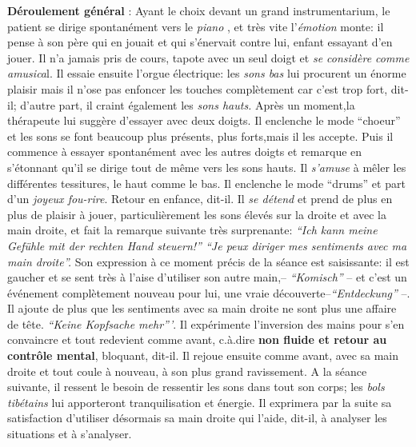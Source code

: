  	 \textbf{Déroulement général} : 
Ayant le choix devant un grand instrumentarium,
        le patient se dirige spontanément vers le \textit{piano },  et très vite
        l'\textit{émotion} monte: il pense à son père qui en jouait et qui
        s'énervait contre lui, enfant essayant d'en
        jouer. Il n'a jamais pris de cours, tapote avec un seul doigt et \textit{se considère comme
        amusica}l. Il essaie ensuite l'orgue électrique: les \textit{sons bas}
        lui procurent un énorme plaisir mais il n'ose pas enfoncer les touches
        complètement car c'est trop fort, dit-il; d'autre part, il
        craint également les
        \textit{sons hauts.}
        Après un moment,la thérapeute lui suggère d'essayer avec deux doigts.
        Il enclenche le mode ``choeur'' et les sons se font beaucoup
        plus présents, plus forts,mais il les accepte. Puis il commence à essayer spontanément
        avec les autres doigts et remarque en s'étonnant qu'il se
        dirige tout de même vers les sons
        hauts. Il \textit{s'amuse} à mêler les différentes tessitures,
        le haut comme le bas.
        Il enclenche le mode ``drums'' et part d'un\textit{ joyeux
        fou-rire}. Retour en enfance, dit-il.
        Il \textit{se détend} et prend de plus en plus de plaisir à jouer, particulièrement  les sons élevés
        sur la droite et avec la main droite, et fait
        la remarque suivante très surprenante:
        \textit{``Ich kann meine Gefühle mit der rechten Hand steuern!''
        ``Je peux diriger mes sentiments avec ma main droite''.}
 Son expression à ce moment précis de la séance est saisissante: il
        est gaucher et se sent très à l'aise d'utiliser son autre
        main,-- \textit{``Komisch''} -- et c'est un événement complètement nouveau pour lui, une vraie
        découverte--\textit{``Entdeckung''} --.
        Il ajoute de plus que les sentiments avec sa main
        droite ne sont plus une affaire de tête. \textit{``Keine
        Kopfsache mehr'''}. Il expérimente l'inversion des mains pour s'en convaincre et tout redevient comme
        avant, c.à.dire \textbf{non fluide et retour au contrôle
          mental}, 
        bloquant, dit-il. Il rejoue ensuite comme avant, avec sa main droite et tout
        coule à nouveau, à son plus grand ravissement.
        A la séance suivante, il ressent le besoin  de ressentir 
        les sons dans tout son corps; les\textit{ bols tibétains } lui
        apporteront tranquilisation et
        énergie. Il
        exprimera par la suite sa satisfaction d'utiliser désormais  sa main
        droite qui l'aide, dit-il, à analyser les
        situations et à 
        s'analyser.

